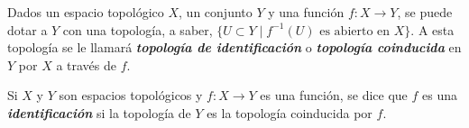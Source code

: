 

\begin{definition}
Dados un espacio topológico $X$, un conjunto $Y$ y una función $f : X \longrightarrow Y$, se puede dotar a $Y$ con una topología, a saber, $\{ U \subset Y \mid f^{-1}(U) \text{ es abierto en } X \}$. A esta topología se le llamará \emph{\bfseries topología de identificación} o \emph{\bfseries topología coinducida} en $Y$ por $X$ a través de $f$.
\end{definition}

\begin{definition}
Si $X$ y $Y$ son espacios topológicos y $f : X \longrightarrow Y$ es una función, se dice que $f$ es una \emph{\bfseries identificación} si la topología de $Y$ es la topología coinducida por $f$.
\end{definition}
